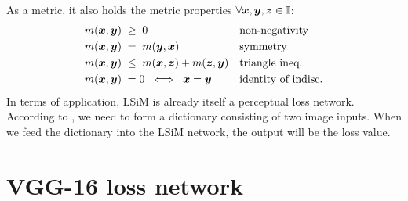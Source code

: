 \documentclass[a4paper,12pt,twoside]{report}
\begin{document}
As a metric, it also holds the metric properties $\forall {\bm{x}},{\bm{y}},{\bm{z}} \in {\mathbb{I}}$:
\begin{align}
    m({\bm{x}},{\bm{y}}) \; &\geq \; 0                && \text{non-negativity} \label{eq: NonNeg}\\
    m({\bm{x}},{\bm{y}}) \; &= \; m({\bm{y}},{\bm{x}})              && \text{symmetry} \label{eq: Sym}\\
    m({\bm{x}},{\bm{y}}) \; &\leq \; m({\bm{x}},{\bm{z}}) + m({\bm{z}},{\bm{y}})  && \text{triangle ineq.} \label{eq: TriIneq}\\
    m({\bm{x}},{\bm{y}}) \; &= 0 \; \iff \; {\bm{x}} = {\bm{y}}     && \text{identity of indisc.} \label{eq: IoI}
\end{align}
In terms of application, LSiM is already itself a perceptual loss network.  According to \citeauthor{kohl2020learning}, we need to form a dictionary consisting of two image inputs. When we feed the dictionary into the LSiM network, the output will be the loss value.
\section{VGG-16 loss network}
\end{document}
